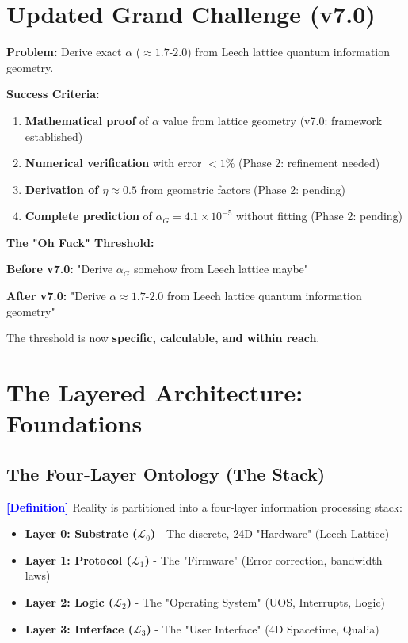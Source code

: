 \documentclass[11pt,titlepage]{article}
\newcommand{\substrate}{\mathcal{L}_0}
\newcommand{\protocol}{\mathcal{L}_1}
\newcommand{\logic}{\mathcal{L}_2}
\newcommand{\interface}{\mathcal{L}_3}
\newcommand{\tagdef}{\textcolor{blue}{\textbf{[Definition]}} }
\begin{document}
\section{Updated Grand Challenge (v7.0)}

\begin{tcolorbox}[colback=red!5!white,colframe=red!75!black,title=Grand Challenge \#1 (v7.0)]
\textbf{Problem:} Derive exact $\alpha$ ($\approx 1.7$-$2.0$) from Leech lattice quantum information geometry.

\textbf{Success Criteria:}
\begin{enumerate}
\item \textbf{Mathematical proof} of $\alpha$ value from lattice geometry (v7.0: framework established)
\item \textbf{Numerical verification} with error $<1\%$ (Phase 2: refinement needed)
\item \textbf{Derivation of $\eta \approx 0.5$} from geometric factors (Phase 2: pending)
\item \textbf{Complete prediction} of $\alpha_G = 4.1\times10^{-5}$ without fitting (Phase 2: pending)
\end{enumerate}
\end{tcolorbox}

\textbf{The "Oh Fuck" Threshold:}

\textbf{Before v7.0:} "Derive $\alpha_G$ somehow from Leech lattice maybe"

\textbf{After v7.0:} "Derive $\alpha \approx 1.7$-$2.0$ from Leech lattice quantum information geometry"

The threshold is now \textbf{specific, calculable, and within reach}.


\section{The Layered Architecture: Foundations}

\subsection{The Four-Layer Ontology (The Stack)}

\tagdef Reality is partitioned into a four-layer information processing stack:
\begin{itemize}
\item \textbf{Layer 0: Substrate ($\substrate$)} - The discrete, 24D "Hardware" (Leech Lattice)
\item \textbf{Layer 1: Protocol ($\protocol$)} - The "Firmware" (Error correction, bandwidth laws)
\item \textbf{Layer 2: Logic ($\logic$)} - The "Operating System" (UOS, Interrupts, Logic)
\item \textbf{Layer 3: Interface ($\interface$)} - The "User Interface" (4D Spacetime, Qualia)
\end{itemize}
\end{document}
